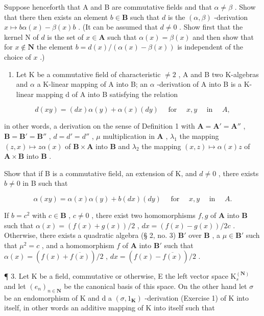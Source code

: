 Suppose henceforth that A and B are commutative fields and that \(\alpha \neq \beta\) . Show that there then exists an element \(b \in \mathbf{B}\) such that \(d\) is the \((\alpha, \beta)\) -derivation \(x \mapsto b\alpha(x) - \beta(x)b\) . (It can be assumed that \(d \neq 0\) . Show first that the kernel N of \(d\) is the set of \(x \in \mathbf{A}\) such that \(\alpha(x) = \beta(x)\) and then show that for \(x \notin \mathbf{N}\) the element \(b = d(x)/( \alpha(x) - \beta(x))\) is independent of the choice of \(x\) .)

\begin{enumerate}
\def\labelenumi{\arabic{enumi}.}
\setcounter{enumi}{1}
\tightlist
\item
  Let K be a commutative field of characteristic \(\neq2\) , A and B two K-algebras and \(\alpha\) a K-linear mapping of A into B; an \(\alpha\) -derivation of A into B is a K-linear mapping d of A into B satisfying the relation
\end{enumerate}

\[
d (x y) = (d x) \alpha (y) + \alpha (x) (d y) \quad \text { for } \quad x, y \quad \text { in } \quad A,
\]

in other words, a derivation on the sense of Definition 1 with \(\mathbf{A} = \mathbf{A}' = \mathbf{A}''\) , \(\mathbf{B} = \mathbf{B}' = \mathbf{B}''\) , \(d = d' = d''\) , \(\mu\) multiplication in \(\mathbf{A}\) , \(\lambda_1\) the mapping \((z,x) \mapsto z\alpha(x)\) of \(\mathbf{B} \times \mathbf{A}\) into \(\mathbf{B}\) and \(\lambda_2\) the mapping \((x,z) \mapsto \alpha(x)z\) of \(\mathbf{A} \times \mathbf{B}\) into \(\mathbf{B}\) .

Show that if B is a commutative field, an extension of K, and \(d \neq 0\) , there exists \(b \neq 0\) in B such that

\[
\alpha (x y) = \alpha (x) \alpha (y) + b (d x) (d y) \quad \text { for } \quad x, y \quad \text { in } \quad A.
\]

If \(b = c^2\) with \(c \in \mathbf{B}\) , \(c \neq 0\) , there exist two homomorphisms \(f, g\) of \(\mathbf{A}\) into \(\mathbf{B}\) such that \(\alpha(x) = (f(x) + g(x)) / 2\) , \(dx = (f(x) - g(x)) / 2c\) . Otherwise, there exists a quadratic algebra (§ 2, no. 3) \(\mathbf{B}'\) over \(\mathbf{B}\) , a \(\mu \in \mathbf{B}'\) such that \(\mu^2 = c\) , and a homomorphism \(f\) of \(\mathbf{A}\) into \(\mathbf{B}'\) such that \(\alpha(x) = (f(x) + \overline{f(x)}) / 2\) , \(dx = (f(x) - \overline{f(x)}) / 2\) .

¶ 3. Let K be a field, commutative or otherwise, E the left vector space \(\mathrm{K}_{s}^{(\mathbf{N})}\) and let \((e_{n})_{n\in\mathbf{N}}\) be the canonical basis of this space. On the other hand let \(\sigma\) be an endomorphism of K and d a \((\sigma,1_{\mathbf{K}})\) -derivation (Exercise 1) of K into itself, in other words an additive mapping of K into itself such that

